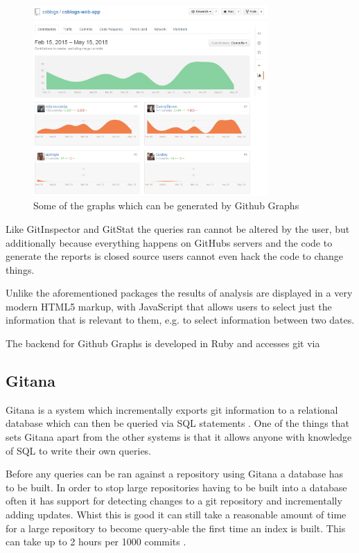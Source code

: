 \documentclass[11pt]{book}
\begin{document}
\begin{figure}[h]
	\centering
	\includegraphics[width=0.8\textwidth]{images/githubgraphs}
	\caption{Some of the graphs which can be generated by Github Graphs \cite{githubgraphs}}
	\label{fig:githubgraphs}
\end{figure} 

Like GitInspector and GitStat the queries ran cannot be altered by the user, but additionally because everything happens on GitHubs servers and the code to generate the reports is closed source users cannot even hack the code to change things.

Unlike the aforementioned packages the results of analysis are displayed in a very modern HTML5 markup, with JavaScript that allows users to select just the information that is relevant to them, e.g. to select information between two dates.

The backend for Github Graphs is developed in Ruby and accesses git via %

\subsection{Gitana}
Gitana is a system which incrementally exports git information to a relational database which can then be queried via SQL statements \cite{gitana}. One of the things that sets Gitana apart from the other systems is that it allows anyone with knowledge of SQL to write their own queries.

Before any queries can be ran against a repository using Gitana a database has to be built. In order to stop large repositories having to be built into a database often it has support for detecting changes to a git repository and incrementally adding updates. Whist this is good it can still take a reasonable amount of time for a large repository to become query-able the first time an index is built. This can take up to 2 hours per 1000 commits \cite{gitana}.
\end{document}
